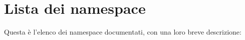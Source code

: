 \section{Lista dei namespace}
Questa è l'elenco dei namespace documentati, con una loro breve descrizione\-:\begin{DoxyCompactList}
\item{}
\end{DoxyCompactList}
